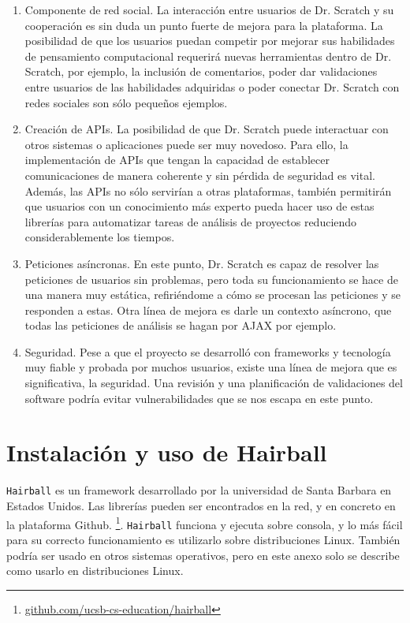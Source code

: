 \documentclass[a4paper, 12pt]{book}
\begin{document}
\begin{enumerate}
  \item Componente de red social. La interacción entre usuarios de Dr. Scratch y su
	cooperación es sin duda un punto fuerte de mejora para la plataforma. La posibilidad
	de que los usuarios puedan competir por mejorar sus habilidades de pensamiento
	computacional requerirá nuevas herramientas dentro de Dr. Scratch, por ejemplo, la
	inclusión de comentarios, poder dar validaciones entre usuarios de las habilidades
	adquiridas o poder conectar Dr. Scratch con redes sociales son sólo pequeños ejemplos.
  \item Creación de APIs. La posibilidad de que Dr. Scratch puede interactuar con
	otros sistemas o aplicaciones puede ser muy novedoso. Para ello, la implementación
	de APIs que tengan la capacidad de establecer comunicaciones de manera coherente y
	sin pérdida de seguridad es vital. Además, las APIs no sólo servirían a otras
	plataformas, también permitirán que usuarios con un conocimiento más experto pueda
	hacer uso de estas librerías para automatizar tareas de análisis de proyectos 
	reduciendo considerablemente los tiempos.
	\item Peticiones asíncronas. En este punto, Dr. Scratch es capaz de resolver las
	peticiones de usuarios sin problemas, pero toda su funcionamiento se hace de una
	manera muy estática, refiriéndome a cómo se procesan las peticiones y se responden
	a estas. Otra línea de mejora es darle un contexto asíncrono, que todas las 
	peticiones de análisis se hagan por AJAX por ejemplo.
	\item Seguridad. Pese a que el proyecto se desarrolló con frameworks y tecnología 
	muy fiable y probada por muchos usuarios, existe una línea de mejora que es 
	significativa, la seguridad. Una revisión y una planificación de validaciones del
	software podría evitar vulnerabilidades que se nos escapa en este punto. 
\end{enumerate}








\cleardoublepage
\appendix

\chapter{Instalación y uso de Hairball}
\texttt{Hairball} es un framework desarrollado por la universidad de Santa
Barbara en Estados Unidos. Las librerías pueden ser encontrados en la red,
y en concreto en la plataforma Github. \footnote{\url{github.com/ucsb-cs-education/hairball}}.
\texttt{Hairball} funciona y ejecuta sobre consola, y lo más fácil para su
correcto funcionamiento es utilizarlo sobre distribuciones Linux. También 
podría ser usado en otros sistemas operativos, pero en este anexo solo se
describe como usarlo en distribuciones Linux. 
\end{document}
